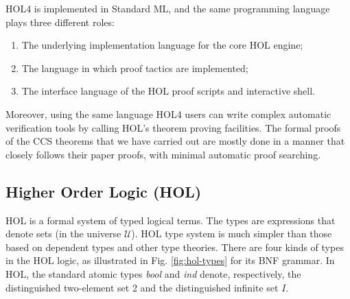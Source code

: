 HOL4 is implemented in Standard ML, and
 the same programming language
plays three different roles:
\begin{enumerate}
\item The underlying implementation language for the core HOL engine;
\item The language in which proof tactics are implemented;
\item The interface language of the HOL proof scripts and interactive shell.
\end{enumerate}
Moreover, using the same language HOL4 users can write complex automatic
verification tools by calling HOL's theorem proving
facilities. The formal proofs of the CCS theorems that we have carried
out 
are mostly done in a manner that closely follows
their paper proofs, with minimal automatic proof searching.

\subsection{Higher Order Logic (HOL)}

HOL is a formal system of typed logical terms. The types are expressions that denote sets (in the
universe $\mathcal{U}$). HOL type system is much simpler than those
based on dependent types and other type theories. There are four kinds of types in the HOL
logic, as illustrated in Fig. \ref{fig:hol-types} for its BNF
grammar. In HOL, the standard atomic types \emph{bool} and \emph{ind}
 denote, respectively, the distinguished two-element set 2 and the
distinguished infinite set $I$.

\newlength{\ttX}
\settowidth{\ttX}{\tt X}
\newcommand{\tyvar}{\setlength{\unitlength}{\ttX}\begin{picture}(1,6)
\put(.5,0){\makebox(0,0)[b]{\footnotesize type variables}}
\put(0,1.5){\vector(0,1){4.5}}
\end{picture}}
\newcommand{\tyatom}{\setlength{\unitlength}{\ttX}\begin{picture}(1,6)
\put(.5,2.3){\makebox(0,0)[b]{\footnotesize atomic types}}
\put(.5,3.3){\vector(0,1){2.6}}
\end{picture}}
\newcommand{\funty}{\setlength{\unitlength}{\ttX}\begin{picture}(1,6)
\put(.5,1.5){\makebox(0,0)[b]{\footnotesize function types}}
\put(.5,0){\makebox(0,0)[b]{\footnotesize (domain $\sigma_1$, codomain $\sigma_2$)}}
\put(1,2.5){\vector(0,1){3.5}}
\end{picture}}
\newcommand{\cmpty}{\setlength{\unitlength}{\ttX}\begin{picture}(1,6)
\put(2,3.3){\makebox(0,0)[b]{\footnotesize compound types}}
\put(1.9,4.5){\vector(0,1){1.5}}
\end{picture}}

